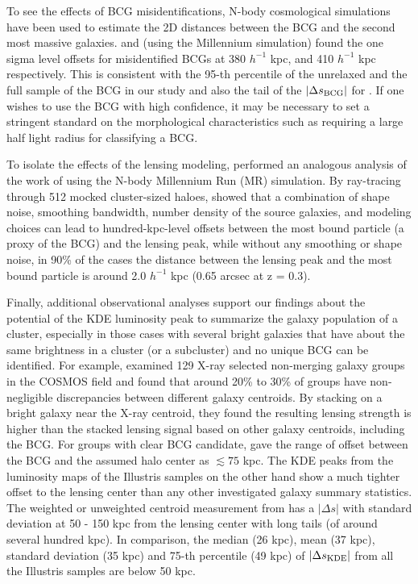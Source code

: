 \documentclass[usenatbib]{mn2e}
\begin{document}
{To see the effects of BCG misidentifications, N-body cosmological
simulations have been used to estimate the 2D distances between the BCG and 
the second most massive galaxies. \cite{Johnston2007b} and 
\cite{Hilbert2010} (using the Millennium simulation)  found 
the one sigma level offsets for misidentified BCGs at 380 $h^{-1}$ kpc, and 410 
$h^{-1}$ kpc respectively. This is consistent with the 95-th percentile of the
unrelaxed and the full sample of the BCG in our study and also the tail of the
$|\Delta s_{\rm BCG}|$ for \cite{Cui2015}. If one wishes to use the BCG with high
confidence, it may be necessary to set a stringent standard on the morphological
characteristics such as requiring a large half light radius for classifying a BCG.

To isolate the effects of the lensing modeling, \cite{Dietrich2012} performed an analogous analysis of the work of \cite{Oguri2010} 
using the N-body Millennium Run (MR) simulation. By ray-tracing through 512 mocked cluster-sized haloes, \cite{Dietrich2012} showed that a combination of shape noise, smoothing bandwidth, number density of the source galaxies, and modeling choices can lead to hundred-kpc-level offsets between the most bound particle 
(a proxy of the BCG) and the lensing peak, while without any smoothing or shape noise, in 90\% of the cases the distance between the lensing peak and the 
most bound particle is around 2.0 $h^{-1}$ kpc
(0.65 arcsec at z = 0.3). 

Finally, additional observational analyses support our findings about the potential of the KDE luminosity peak to summarize the galaxy population of a cluster, especially in those cases with several bright galaxies that have about the same brightness 
in a cluster (or a subcluster) and no unique BCG can be identified. 
For example, \cite{George2012a} examined 129 X-ray selected non-merging galaxy 
groups in the COSMOS field and found that around 20\% to 30\% of groups have non-negligible discrepancies
between different galaxy centroids. 
By stacking on a bright galaxy near the X-ray centroid, they found  
the resulting lensing strength is higher than the stacked lensing signal based
on other galaxy centroids, including the BCG. 
For groups with clear BCG candidate, \cite{George2012a} gave the range of
offset between the BCG and the assumed halo center as $\lesssim 75$ kpc. 
The KDE peaks from the luminosity maps of the Illustris samples on the other hand show a much 
tighter offset to the 
lensing center than any other investigated galaxy summary statistics. 
The weighted or unweighted centroid measurement from \cite{George2012a} has a 
$|\Delta s|$ with standard deviation at 50 - 150 kpc from the
lensing center with long tails (of around several hundred kpc). 
In comparison, the median (26 kpc), mean (37 kpc), standard deviation (35 kpc) 
and 75-th percentile (49 kpc) of 
$|\Delta s_{\rm KDE}|$ from all the Illustris samples are below 50 kpc. 

}
\end{document}
